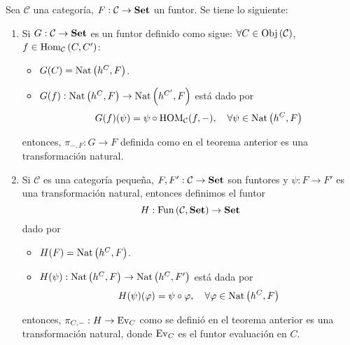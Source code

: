 \documentclass[12pt]{report}
\newcounter{it}
\theoremstyle{largebreak}
\newcommand\cf[3]{\ensuremath{#1:#2\rightarrow#3}}
\newcommand{\Obj}[1]{\ensuremath{\textup{Obj}\left(#1\right)}}
\newcommand{\Hom}[3]{\ensuremath{\textup{Hom}_{#1}\left(#2,#3\right)}}
\newcommand{\Cat}[1]{\ensuremath{\textup{\textbf{#1}}}}
\newcommand{\Fun}[2]{\ensuremath{\textup{Fun}\left(#1,#2\right)}}
\newcommand{\Ev}{\ensuremath{\textup{Ev}}}
\begin{document}
    \begin{theor}
        Sea $\mathcal{C}$ una categoría, $\cf{F}{\mathcal{C}}{\Cat{Set}}$  un funtor. Se tiene lo siguiente:
        \begin{enumerate}
            \item Si $\cf{G}{\mathcal{C}}{\Cat{Set}}$ es un funtor definido como sigue: $\forall C\in\Obj{\mathcal{C}}$, $f\in\Hom{\mathcal{C}}{C}{C'}$:
            \begin{itemize}
                \item $G(C)=\textup{Nat}\left(h^C,F\right)$.
                \item $\cf{G(f)}{\Nat{h^C}{F}}{\Nat{h^{C'}}{F}}$ está dado por 
                \begin{equation*}
                    G(f)(\psi)=\psi\circ\textup{HOM}_{\mathcal{C}}(f,-),\quad\forall\psi\in\textup{Nat}\left(h^C,F\right)
                \end{equation*}
            \end{itemize}
            entonces, $\cf{\pi_{ -,F}}{G}{F}$ definida como en el teorema anterior es una transformación natural.
            \item Si $\mathcal{C}$ es una categoría pequeña, $\cf{F,F'}{\mathcal{C}}{\Cat{Set}}$ son funtores y $\cf{\psi}{F}{F'}$ es una transformación natural, entonces definimos el funtor
            \begin{equation*}
                \cf{H}{\Fun{\mathcal{C}}{\Cat{Set}}}{\Cat{Set}}
            \end{equation*}
            dado por
            \begin{itemize}
                \item $H(F)=\textup{Nat}\left(h^C,F\right)$.
                \item $\cf{H(\psi)}{\Nat{h^C}{F}}{\Nat{h^C}{F'}}$ está dada por
                \begin{equation*}
                    H(\psi)(\varphi)=\psi\circ\varphi,\quad\forall\varphi\in\textup{Nat}\left(h^C,F\right)
                \end{equation*}
            \end{itemize}
            entonces, $\cf{\pi_{ C,-}}{H}{\Ev_C}$ como se definió en el teorema anterior es una transformación natural, donde $\Ev_C$ es el funtor evaluación en $C$.
        \end{enumerate}
    \end{theor}
\end{document}
